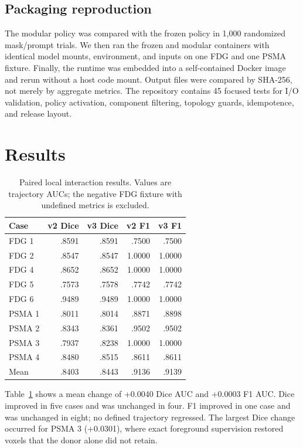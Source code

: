 \documentclass[runningheads]{llncs}
\begin{document}
\subsection{Packaging reproduction}

The modular policy was compared with the frozen policy in 1,000 randomized
mask/prompt trials. We then ran the frozen and modular containers with
identical model mounts, environment, and inputs on one FDG and one PSMA
fixture. Finally, the runtime was embedded into a self-contained Docker image
and rerun without a host code mount. Output files were compared by SHA-256,
not merely by aggregate metrics. The repository contains 45 focused tests for
I/O validation, policy activation, component filtering, topology guards,
idempotence, and release layout.

\section{Results}

\begin{table}[t]
\caption{Paired local interaction results. Values are trajectory AUCs; the
negative FDG fixture with undefined metrics is excluded.}
\label{tab:local}
\centering
\small
\setlength{\tabcolsep}{4pt}
\begin{tabular}{lrrrr}
\toprule
Case & v2 Dice & v3 Dice & v2 F1 & v3 F1 \\
\midrule
FDG 1 & .8591 & .8591 & .7500 & .7500 \\
FDG 2 & .8547 & .8547 & 1.0000 & 1.0000 \\
FDG 4 & .8652 & .8652 & 1.0000 & 1.0000 \\
FDG 5 & .7573 & .7578 & .7742 & .7742 \\
FDG 6 & .9489 & .9489 & 1.0000 & 1.0000 \\
PSMA 1 & .8011 & .8014 & .8871 & .8898 \\
PSMA 2 & .8343 & .8361 & .9502 & .9502 \\
PSMA 3 & .7937 & .8238 & 1.0000 & 1.0000 \\
PSMA 4 & .8480 & .8515 & .8611 & .8611 \\
\midrule
Mean & .8403 & .8443 & .9136 & .9139 \\
\bottomrule
\end{tabular}
\end{table}

Table~\ref{tab:local} shows a mean change of +0.0040 Dice AUC and +0.0003
F1 AUC. Dice improved in five cases and was unchanged in four. F1 improved in
one case and was unchanged in eight; no defined trajectory regressed. The
largest Dice change occurred for PSMA 3 (+0.0301), where exact foreground
supervision restored voxels that the donor alone did not retain.
\end{document}
